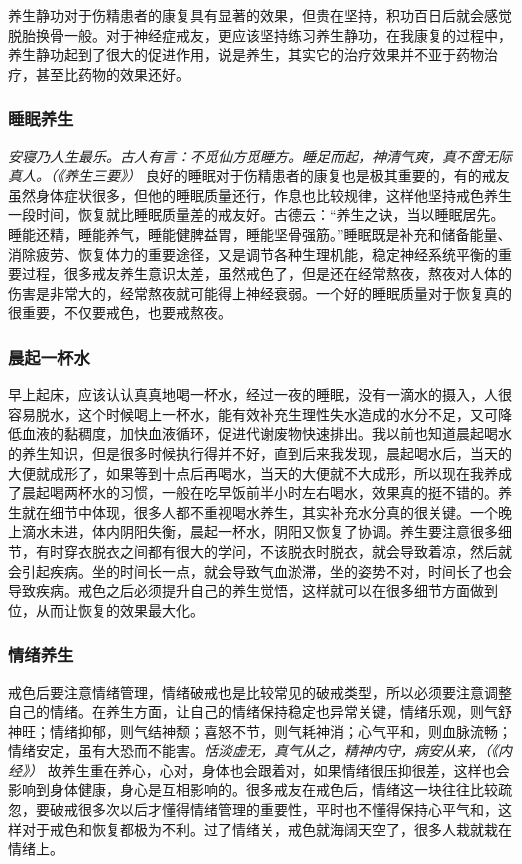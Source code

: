养生静功对于伤精患者的康复具有显著的效果，但贵在坚持，积功百日后就会感觉脱胎换骨一般。对于神经症戒友，更应该坚持练习养生静功，在我康复的过程中，养生静功起到了很大的促进作用，说是养生，其实它的治疗效果并不亚于药物治疗，甚至比药物的效果还好。

\subsubsection{睡眠养生}

\textit{安寝乃人生最乐。古人有言：不觅仙方觅睡方。睡足而起，神清气爽，真不啻无际真人。（《养生三要》）} 良好的睡眠对于伤精患者的康复也是极其重要的，有的戒友虽然身体症状很多，但他的睡眠质量还行，作息也比较规律，这样他坚持戒色养生一段时间，恢复就比睡眠质量差的戒友好。古德云：“养生之诀，当以睡眠居先。睡能还精，睡能养气，睡能健脾益胃，睡能坚骨强筋。”睡眠既是补充和储备能量、消除疲劳、恢复体力的重要途径，又是调节各种生理机能，稳定神经系统平衡的重要过程，很多戒友养生意识太差，虽然戒色了，但是还在经常熬夜，熬夜对人体的伤害是非常大的，经常熬夜就可能得上神经衰弱。一个好的睡眠质量对于恢复真的很重要，不仅要戒色，也要戒熬夜。

\subsubsection{晨起一杯水}

早上起床，应该认认真真地喝一杯水，经过一夜的睡眠，没有一滴水的摄入，人很容易脱水，这个时候喝上一杯水，能有效补充生理性失水造成的水分不足，又可降低血液的黏稠度，加快血液循环，促进代谢废物快速排出。我以前也知道晨起喝水的养生知识，但是很多时候执行得并不好，直到后来我发现，晨起喝水后，当天的大便就成形了，如果等到十点后再喝水，当天的大便就不大成形，所以现在我养成了晨起喝两杯水的习惯，一般在吃早饭前半小时左右喝水，效果真的挺不错的。养生就在细节中体现，很多人都不重视喝水养生，其实补充水分真的很关键。一个晚上滴水未进，体内阴阳失衡，晨起一杯水，阴阳又恢复了协调。养生要注意很多细节，有时穿衣脱衣之间都有很大的学问，不该脱衣时脱衣，就会导致着凉，然后就会引起疾病。坐的时间长一点，就会导致气血淤滞，坐的姿势不对，时间长了也会导致疾病。戒色之后必须提升自己的养生觉悟，这样就可以在很多细节方面做到位，从而让恢复的效果最大化。

\subsubsection{情绪养生}

戒色后要注意情绪管理，情绪破戒也是比较常见的破戒类型，所以必须要注意调整自己的情绪。在养生方面，让自己的情绪保持稳定也异常关键，情绪乐观，则气舒神旺；情绪抑郁，则气结神颓；喜怒不节，则气耗神消；心气平和，则血脉流畅；情绪安定，虽有大恐而不能害。\textit{恬淡虚无，真气从之，精神内守，病安从来，（《内经》）} 故养生重在养心，心对，身体也会跟着对，如果情绪很压抑很差，这样也会影响到身体健康，身心是互相影响的。很多戒友在戒色后，情绪这一块往往比较疏忽，要破戒很多次以后才懂得情绪管理的重要性，平时也不懂得保持心平气和，这样对于戒色和恢复都极为不利。过了情绪关，戒色就海阔天空了，很多人栽就栽在情绪上。

